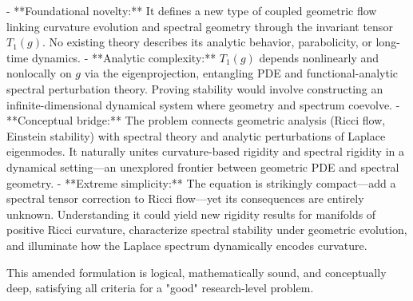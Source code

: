 - **Foundational novelty:** It defines a new type of coupled geometric flow linking curvature evolution and spectral geometry through the invariant tensor \(T_1(g)\). No existing theory describes its analytic behavior, parabolicity, or long-time dynamics.  
- **Analytic complexity:** \(T_1(g)\) depends nonlinearly and nonlocally on \(g\) via the eigenprojection, entangling PDE and functional-analytic spectral perturbation theory. Proving stability would involve constructing an infinite-dimensional dynamical system where geometry and spectrum coevolve.  
- **Conceptual bridge:** The problem connects geometric analysis (Ricci flow, Einstein stability) with spectral theory and analytic perturbations of Laplace eigenmodes. It naturally unites curvature-based rigidity and spectral rigidity in a dynamical setting—an unexplored frontier between geometric PDE and spectral geometry.  
- **Extreme simplicity:** The equation is strikingly compact—add a spectral tensor correction to Ricci flow—yet its consequences are entirely unknown. Understanding it could yield new rigidity results for manifolds of positive Ricci curvature, characterize spectral stability under geometric evolution, and illuminate how the Laplace spectrum dynamically encodes curvature.  

This amended formulation is logical, mathematically sound, and conceptually deep, satisfying all criteria for a "good" research-level problem.